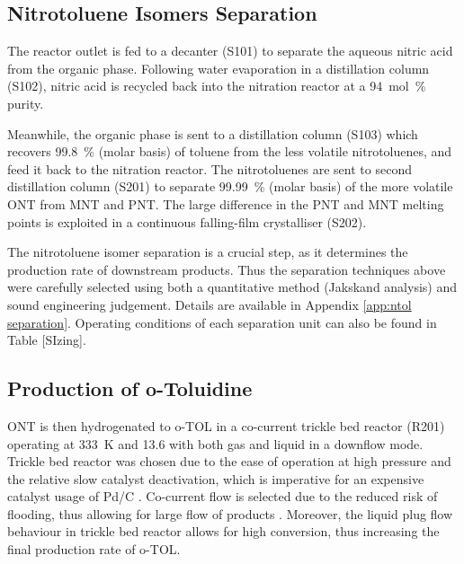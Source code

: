 
\subsection{Nitrotoluene Isomers Separation}
The reactor outlet is fed to a decanter (S101) to separate the aqueous nitric acid from the organic phase. Following water evaporation in a distillation column (S102), nitric acid is recycled back into the nitration reactor at a \SI{94}{mol\percent} purity.

Meanwhile, the organic phase is sent to a distillation column (S103) which recovers \SI{99.8}{\percent} (molar basis) of toluene from the less volatile nitrotoluenes, and feed it back to the nitration reactor. The nitrotoluenes are sent to second distillation column (S201) to separate \SI{99.99}{\percent} (molar basis) of the more volatile ONT from MNT and PNT. The large difference in the PNT and MNT melting points is exploited in a continuous falling-film crystalliser (S202). 


The nitrotoluene isomer separation is a crucial step, as it determines the production rate of downstream products. Thus the separation techniques above were carefully selected using both a quantitative method (Jakskand analysis) \cite{jaksland_separation_1995} and sound engineering judgement. Details are available in Appendix \ref{app:ntol separation}. Operating conditions of each separation unit can also be found in Table [SIzing]. 

\subsection{Production of o-Toluidine}
ONT is then hydrogenated to o-TOL in a co-current trickle bed reactor (R201) operating at \SI{333}{\K} and \SI{13.6}{\atm} with both gas and liquid in a downflow mode. Trickle bed reactor was chosen due to the ease of operation at high pressure and the relative slow catalyst deactivation, which is imperative for an expensive catalyst usage of Pd/C \cite{vemala_hydrodynamic_nodate}. Co-current flow is selected due to the reduced risk of flooding, thus allowing for large flow of products \cite{vemala_hydrodynamic_nodate}. Moreover, the liquid plug flow behaviour in trickle bed reactor allows for high conversion, thus increasing the final production rate of o-TOL. 

